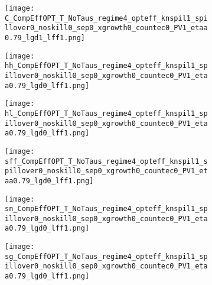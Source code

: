 \begin{figure}[h!!]
	\centering
	\caption{Laissez-faire, optimal, and efficient allocation in levels: no knowledge spillovers }\label{fig:LF_noKN}	
	\begin{subfigure}[]{0.32\textwidth}
		\texttt{[image: C\_CompEffOPT\_T\_NoTaus\_regime4\_opteff\_knspil1\_spillover0\_noskill0\_sep0\_xgrowth0\_countec0\_PV1\_etaa0.79\_lgd1\_lff1.png]}
	\end{subfigure}	
	\begin{subfigure}[]{0.32\textwidth}
		\texttt{[image: hh\_CompEffOPT\_T\_NoTaus\_regime4\_opteff\_knspil1\_spillover0\_noskill0\_sep0\_xgrowth0\_countec0\_PV1\_etaa0.79\_lgd0\_lff1.png]}
	\end{subfigure}	
	\begin{subfigure}[]{0.32\textwidth}
		\texttt{[image: hl\_CompEffOPT\_T\_NoTaus\_regime4\_opteff\_knspil1\_spillover0\_noskill0\_sep0\_xgrowth0\_countec0\_PV1\_etaa0.79\_lgd0\_lff1.png]}
	\end{subfigure}	
	\begin{subfigure}[]{0.32\textwidth}
		\texttt{[image: sff\_CompEffOPT\_T\_NoTaus\_regime4\_opteff\_knspil1\_spillover0\_noskill0\_sep0\_xgrowth0\_countec0\_PV1\_etaa0.79\_lgd0\_lff1.png]}
	\end{subfigure}	
	\begin{subfigure}[]{0.32\textwidth}
		\texttt{[image: sn\_CompEffOPT\_T\_NoTaus\_regime4\_opteff\_knspil1\_spillover0\_noskill0\_sep0\_xgrowth0\_countec0\_PV1\_etaa0.79\_lgd0\_lff1.png]}
	\end{subfigure}	
	\begin{subfigure}[]{0.32\textwidth}
		\texttt{[image: sg\_CompEffOPT\_T\_NoTaus\_regime4\_opteff\_knspil1\_spillover0\_noskill0\_sep0\_xgrowth0\_countec0\_PV1\_etaa0.79\_lgd0\_lff1.png]}
	\end{subfigure}
\end{figure}

